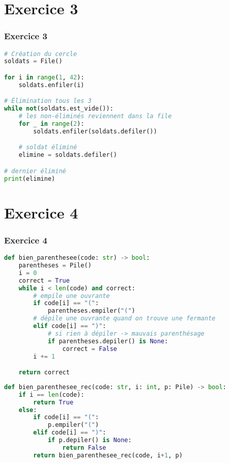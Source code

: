 \documentclass[svgnames,11pt]{beamer}
\begin{document}
\section{Exercice 3}
\begin{frame}[fragile]
    \frametitle{Exercice 3}

\begin{lstlisting}[language=Python , basicstyle=\ttfamily\small, xleftmargin=2em, xrightmargin=2em]
# Création du cercle
soldats = File()

for i in range(1, 42):
    soldats.enfiler(i)

# Élimination tous les 3
while not(soldats.est_vide()):
    # les non-éliminés reviennent dans la file
    for _ in range(2):
        soldats.enfiler(soldats.defiler())

    # soldat éliminé
    elimine = soldats.defiler()

# dernier éliminé
print(elimine)
\end{lstlisting}

\end{frame}
\section{Exercice 4}
\begin{frame}[fragile]
    \frametitle{Exercice 4}

\begin{lstlisting}[language=Python , basicstyle=\ttfamily\small, xleftmargin=2em, xrightmargin=2em]
def bien_parenthesee(code: str) -> bool:
    parentheses = Pile()
    i = 0
    correct = True
    while i < len(code) and correct:
        # empile une ouvrante
        if code[i] == "(":
            parentheses.empiler("(")
        # dépile une ouvrante quand on trouve une fermante
        elif code[i] == ")":
            # si rien à dépiler -> mauvais parenthésage
            if parentheses.depiler() is None:
                correct = False
        i += 1

    return correct
\end{lstlisting}

\end{frame}
\begin{frame}[fragile]

\begin{lstlisting}[language=Python , basicstyle=\ttfamily\small, xleftmargin=0em, xrightmargin=0em]
def bien_parenthesee_rec(code: str, i: int, p: Pile) -> bool:
    if i == len(code):
        return True
    else:
        if code[i] == "(":
            p.empiler("(")
        elif code[i] == ")":
            if p.depiler() is None:
                return False
        return bien_parenthesee_rec(code, i+1, p)
\end{lstlisting}

\end{frame}
\end{document}
